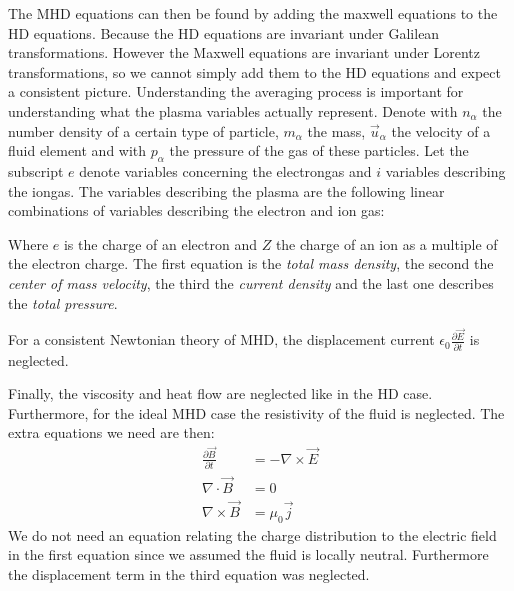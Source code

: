 The MHD equations can then be found by adding the maxwell equations to the HD equations. Because the HD equations are invariant under Galilean transformations. 
However the Maxwell equations are invariant under Lorentz transformations, so we cannot simply add them to the HD equations and expect a consistent picture. 
Understanding the averaging process is important for understanding what the plasma variables actually represent.
Denote with $n_\alpha$ the number density of a certain type of particle, $m_\alpha$ the mass, $\vec{u}_\alpha$ the velocity of a fluid element and with $p_\alpha$ the pressure of the gas of these particles. 
Let the subscript $e$ denote variables concerning the electrongas and $i$ variables describing the iongas.
The variables describing the plasma are the following linear combinations of variables describing the electron and ion gas:

{\centering 
\noindent {}
\par}

Where $e$ is the charge of an electron and $Z$ the charge of an ion as a multiple of the electron charge. The first equation is the \emph{total mass density}, the second the \emph{center of mass velocity}, the third the \emph{current density} and the last one describes the \emph{total pressure}.

For a consistent Newtonian theory of MHD, the displacement current $\epsilon_0 \frac{\partial \vec{E}}{\partial t}$ is neglected. 

Finally, the viscosity and heat flow are neglected like in the HD case. Furthermore, for the ideal MHD case the resistivity of the fluid is neglected. The extra equations we need are then:
\begin{align*}
	\frac{\partial \vec{B}}{\partial t} &= - \nabla \times \vec{E}\\
	\nabla \cdot \vec{B} &= 0\\
	\nabla \times \vec{B} &= \mu_0 \vec{j}
\end{align*}
We do not need an equation relating the charge distribution to the electric field in the first equation since we assumed the fluid is locally neutral.
Furthermore the displacement term in the third equation was neglected.

